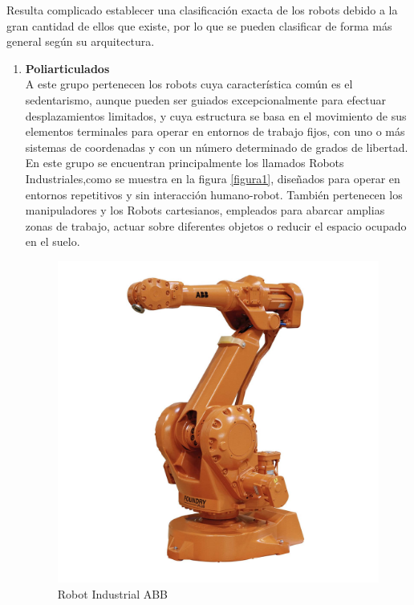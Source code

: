 Resulta complicado establecer una clasificación exacta de los robots debido a la gran cantidad de ellos que existe, por lo que se pueden clasificar de forma más general según su arquitectura. 

\begin{enumerate}

\item \textbf{Poliarticulados}\\ A este grupo pertenecen los robots cuya característica común es el sedentarismo, aunque pueden ser guiados excepcionalmente para efectuar desplazamientos limitados, y cuya estructura se basa en el movimiento de sus elementos terminales para operar en entornos de trabajo fijos, con uno o más sistemas de coordenadas y con un número determinado de grados de libertad. En este grupo se encuentran principalmente los llamados Robots Industriales,como se muestra en la figura \eqref{figura1}, diseñados para operar en entornos repetitivos y sin interacción humano-robot. También pertenecen los manipuladores y los Robots cartesianos, empleados para abarcar amplias zonas de trabajo, actuar sobre diferentes objetos o reducir el espacio ocupado en el suelo.

\begin{figure}[H]
\centering
\includegraphics[scale=0.12]{imagenes/apartado_2/21_poliarticulado1_Robot_Industrial_ABB}
\caption{Robot Industrial ABB}
\label{figura21}
\end{figure}


\end{enumerate}

